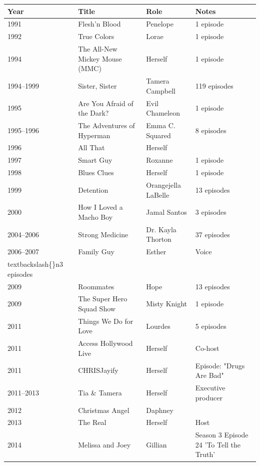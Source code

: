 \documentclass{article}
\begin{document}
\begin{tabular}{llll}
\toprule
Year & Title & Role & Notes \\
\midrule
1991 & Flesh'n Blood & Penelope & 1 episode \\
1992 & True Colors & Lorae & 1 episode \\
1994 & The All-New Mickey Mouse (MMC) & Herself & 1 episode \\
1994–1999 & Sister, Sister & Tamera Campbell & 119 episodes \\
1995 & Are You Afraid of the Dark? & Evil Chameleon & 1 episode \\
1995–1996 & The Adventures of Hyperman & Emma C. Squared & 8 episodes \\
1996 & All That & Herself &  \\
1997 & Smart Guy & Roxanne & 1 episode \\
1998 & Blues Clues & Herself & 1 episode \\
1999 & Detention & Orangejella LaBelle & 13 episodes \\
2000 & How I Loved a Macho Boy & Jamal Santos & 3 episodes \\
2004–2006 & Strong Medicine & Dr. Kayla Thorton & 37 episodes \\
2006–2007 & Family Guy & Esther & Voice\\textbackslash\{\}n3 episodes \\
2009 & Roommates & Hope & 13 episodes \\
2009 & The Super Hero Squad Show & Misty Knight & 1 episode \\
2011 & Things We Do for Love & Lourdes & 5 episodes \\
2011 & Access Hollywood Live & Herself & Co-host \\
2011 & CHRISJayify & Herself & Episode: "Drugs Are Bad" \\
2011–2013 & Tia \& Tamera & Herself & Executive producer \\
2012 & Christmas Angel & Daphney &  \\
2013 & The Real & Herself & Host \\
2014 & Melissa and Joey & Gillian & Season 3 Episode 24 'To Tell the Truth' \\
\bottomrule
\end{tabular}
\end{document}
